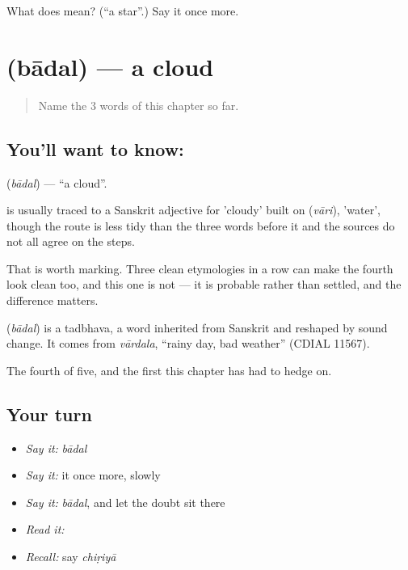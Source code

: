 \begin{tcolorbox}[breakable,colback=teal!4,colframe=teal!35!black,title={Before you move on}]
What does  mean? (\textquotedblleft{}a star\textquotedblright{}.) Say it once more.
\end{tcolorbox}
\section[\texorpdfstring{\hi{बादल} (bādal)}{बादल (bādal)}]{ (bādal) — a cloud}

\label{lesson:HI-C55-cloud}



\begin{quote}
Name the 3 words of this chapter so far.
\end{quote}

\subsection*{You'll want to know: }
\textbf{} (\emph{bādal}) — \textquotedblleft{}a cloud\textquotedblright{}.

 is usually traced to a Sanskrit adjective for 'cloudy' built on  (\emph{vāri}), 'water', though the route is less tidy than the three words before it and the sources do not all agree on the steps.

That is worth marking. Three clean etymologies in a row can make the fourth look clean too, and this one is not — it is probable rather than settled, and the difference matters.

\begin{cousinweb}
\textbf{} (\emph{bādal}) is a tadbhava, a word inherited from Sanskrit and reshaped by sound change. It comes from \emph{vārdala}, \textquotedblleft{}rainy day, bad weather\textquotedblright{} (CDIAL 11567).
\end{cousinweb}

\begin{grammarlens}[title={What you've built}]
The fourth of five, and the first this chapter has had to hedge on.
\end{grammarlens}

\subsection*{Your turn}
\begin{itemize}
\raggedright
  \item \emph{Say it:} \emph{bādal}
  \item \emph{Say it:} it once more, slowly
  \item \emph{Say it:} \emph{bādal}, and let the doubt sit there
  \item \emph{Read it:} \textbf{}
  \item \emph{Recall:} say \emph{chiṛiyā}
\end{itemize}

